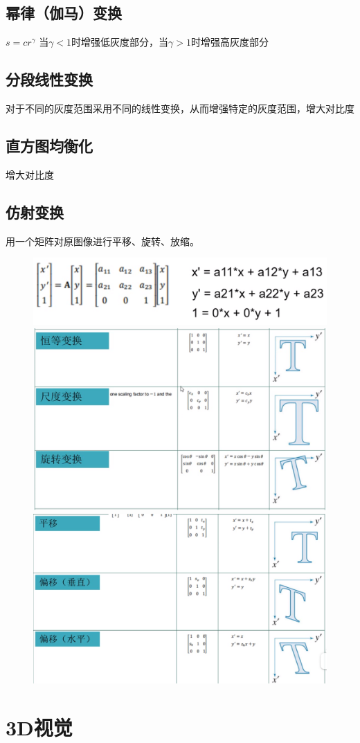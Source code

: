\documentclass[11pt]{article}
\begin{document}
\subsection{幂律（伽马）变换}
$s=cr^\gamma$  \qquad  当$\gamma < 1$时增强低灰度部分，当$\gamma > 1$时增强高灰度部分

\subsection{分段线性变换}
对于不同的灰度范围采用不同的线性变换，从而增强特定的灰度范围，增大对比度

\subsection{直方图均衡化}
增大对比度

\subsection{仿射变换}
用一个矩阵对原图像进行平移、旋转、放缩。
\begin{figure}[htb]
    \includegraphics[scale=0.1]{imgs/affine.png}
    \includegraphics[scale=0.1]{imgs/affine_1.png}
    \includegraphics[scale=0.1]{imgs/affine_2.png}
\end{figure}


\section{3D视觉}
\end{document}
